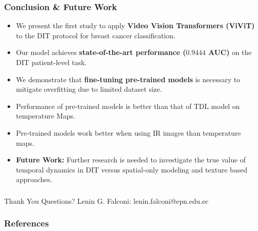 \documentclass{beamer}
\begin{document}
\begin{frame}
  \frametitle{Conclusion \& Future Work}
  \begin{itemize}
    \item We present the first study to apply \textbf{Video Vision Transformers (ViViT)} to the DIT protocol for breast cancer classification.
    \item Our model achieves \textbf{state-of-the-art performance ($0.9444$ AUC)} on the DIT patient-level task.
    \item We demonstrate that \textbf{fine-tuning pre-trained models}
      is necessary to mitigate overfitting due to limited dataset
      size.
    \item Performance of pre-trained models is better than that of
      \ac{TDL} model on temperature Maps.
    \item Pre-trained models work better when using \ac{IR} images
      than temperature maps.
    \item \textbf{Future Work:} Further research is needed to
      investigate the true value of temporal dynamics in DIT versus
      spatial-only modeling and texture based approaches.
  \end{itemize}
\end{frame}

\begin{frame}
  \frametitle{} %
  \centering
  \Huge
  Thank You
  \vspace{1em}
  \Large
  Questions?
  \vfill
  \small
  Lenin G. Falconi: lenin.falconi@epn.edu.ec \\
\end{frame}
\begin{frame}[allowframebreaks]
    \frametitle{References}
    \printbibliography
\end{frame}
\end{document}
